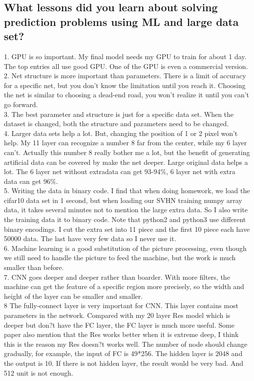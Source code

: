 \documentclass[twocolumn]{webofc}
\begin{document}
\subsection{What lessons did you learn about solving prediction problems using ML and large data set?}\label{sec:formatting}
1. GPU is so important. My final model needs my GPU to train for about 1 day. The top entries all use good GPU. One of the GPU is even a commercial version.\\
2. Net structure is more important than parameters. There is a limit of accuracy for a specific net, but you don't know the limitation until you reach it. Choosing the net is similar to choosing a dead-end road, you won't realize it until you can't go forward. \\
3. The best parameter and structure is just for a specific data set. When the dataset is changed, both the structure and parameters need to be changed. \\
4. Larger data sets help a lot. But, changing the position of 1 or 2 pixel won't help. My 11 layer can recognize a number 8 far from the center, while my 6 layer can't. Actually this number 8 really bother me a lot, but the benefit of generating artificial data can be covered by make the net deeper. Large original data helps a lot. The 6 layer net without extradata can get 93-94\%, 6 layer net with extra data can get 96\%. \\
5. Writing the data in binary code. I find that when doing homework, we load the cifar10 data set in 1 second, but when loading our SVHN training numpy array data, it takes several minutes not to mention the large extra data. So I also write the training data it to binary code. Note that python2 and python3 use different binary encodings. I cut the extra set into 11 piece and the first 10 piece each have 50000 data. The last have very few data so I never use it.\\
6. Machine learning is a good substitution of the picture processing, even though we still need to handle the picture to feed the machine, but the work is much smaller than before. \\
7. CNN goes deeper and deeper rather than boarder. With more filters, the machine can get the feature of a specific region more precisely, so the width and height of the layer can be smaller and smaller. \\
8 The fully-connect layer is very important for CNN. This layer contains most parameters in the network. Compared with my 20 layer Res model which is deeper but don?t have the FC layer, the FC layer is much more useful. Some paper also mention that the Res works better when it is extreme deep, I think this is the reason my Res doesn?t works well. The number of node should change gradually, for example, the input of FC is 49*256. The hidden layer is 2048 and the output is 10. If there is not hidden layer, the result would be very bad.  And 512 unit is not enough.\\ 
\end{document}
